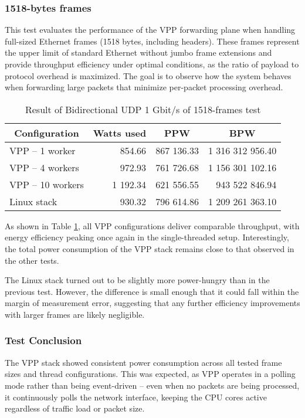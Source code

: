 \subsubsection{1518-bytes frames}
This test evaluates the performance of the VPP forwarding plane when handling full-sized Ethernet frames (1518 bytes, including headers). 
These frames represent the upper limit of standard Ethernet without jumbo frame extensions and provide throughput efficiency under optimal conditions, 
as the ratio of payload to protocol overhead is maximized. The goal is to observe how the system behaves when forwarding large packets that minimize per-packet processing overhead.

\begin{table}[h!]
\centering
\begin{tabular}{|l|r|r|r|}
\hline
\multicolumn{1}{|c|}{\textbf{Configuration}} &
\multicolumn{1}{c|}{\textbf{Watts used}} &
\multicolumn{1}{c|}{\textbf{PPW}} &
\multicolumn{1}{c|}{\textbf{BPW}} \\
\hline
VPP -- 1 worker & 854.66 & 867 136.33 & 1 316 312 956.40 \\
VPP -- 4 workers & 972.93 & 761 726.68 & 1 156 301 102.16 \\
VPP -- 10 workers & 1 192.34 & 621 556.55 & 943 522 846.94 \\
Linux stack & 930.32 & 796 614.86 & 1 209 261 363.10 \\
\hline
\end{tabular}
\caption{Result of Bidirectional UDP 1 Gbit/s of 1518-frames test}
\label{tab:udp:five}
\end{table}

As shown in Table \ref{tab:udp:five}, all VPP configurations deliver comparable throughput, with energy efficiency peaking once again in the single-threaded setup. 
Interestingly, the total power consumption of the VPP stack remains close to that observed in the other tests.

The Linux stack turned out to be slightly more power-hungry than in the previous test. 
However, the difference is small enough that it could fall within the margin of measurement error, suggesting that any further efficiency improvements with larger frames are likely negligible.

\subsubsection{Test Conclusion}
The VPP stack showed consistent power consumption across all tested frame sizes and thread configurations. 
This was expected, as VPP operates in a polling mode rather than being event-driven -- even when no packets are being processed, 
it continuously polls the network interface, keeping the CPU cores active regardless of traffic load or packet size.

